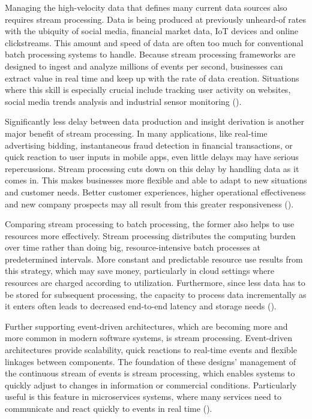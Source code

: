 Managing the high-velocity data that defines many current data sources also requires stream processing. Data is being produced at previously unheard-of rates with the ubiquity of social media, financial market data, IoT devices and online clickstreams. This amount and speed of data are often too much for conventional batch processing systems to handle. Because stream processing frameworks are designed to ingest and analyze millions of events per second, businesses can extract value in real time and keep up with the rate of data creation. Situations where this skill is especially crucial include tracking user activity on websites, social media trends analysis and industrial sensor monitoring (\cite{akidauStreamingSystemsWhat2018})\footnotemark[37].

Significantly less delay between data production and insight derivation is another major benefit of stream processing. In many applications, like real-time advertising bidding, instantaneous fraud detection in financial transactions, or quick reaction to user inputs in mobile apps, even little delays may have serious repercussions. Stream processing cuts down on this delay by handling data as it comes in. This makes businesses more flexible and able to adapt to new situations and customer needs. Better customer experiences, higher operational effectiveness and new company prospects may all result from this greater responsiveness (\cite{akidauStreamingSystemsWhat2018})\footnotemark[37].

Comparing stream processing to batch processing, the former also helps to use resources more effectively. Stream processing distributes the computing burden over time rather than doing big, resource-intensive batch processes at predetermined intervals. More constant and predictable resource use results from this strategy, which may save money, particularly in cloud settings where resources are charged according to utilization. Furthermore, since less data has to be stored for subsequent processing, the capacity to process data incrementally as it enters often leads to decreased end-to-end latency and storage needs (\cite{akidauStreamingSystemsWhat2018})\footnotemark[37].

Further supporting event-driven architectures, which are becoming more and more common in modern software systems, is stream processing. Event-driven architectures provide scalability, quick reactions to real-time events and flexible linkages between components. The foundation of these designs' management of the continuous stream of events is stream processing, which enables systems to quickly adjust to changes in information or commercial conditions. Particularly useful is this feature in microservices systems, where many services need to communicate and react quickly to events in real time (\cite{akidauStreamingSystemsWhat2018})\footnotemark[37].

